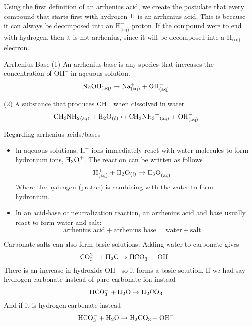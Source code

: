 \documentclass[12pt]{report}
\begin{document}
\begin{remark}{ } 
    Using the first definition of an arrhenius acid, we create the postulate that every compound that starts first with hydrogen $ \ce{H}$ is an arrhenius acid. This is because it can always be decomposed into an $\text{H}^{+}_{\text{(aq)}}$ proton. If the compound were to end with hydrogen, then it is not arrhenius, since it will be decomposed into a $\text{H}^{-}_{\text{(aq)}}$ electron. 
\end{remark}

\begin{definition}{Arrhenius Base}
    (1) An arrhenius base is any species that increases the concentration of $\text{OH}^{-}$ in aqeuous solution. 
    \[
        \ce{NaOH_{(aq)}}\to \ce{Na^{+}_{(aq)}}+ \text{OH}^{-}_{\text{(aq)}}
    \]

    (2) A substance that produces $\text{OH}^{-}$ when dissolved in water. 
    \[
        \ce{CH3NH2_{(aq)}}+ \ce{H2O_{(\l)}}\leftrightarrow \ce{CH3} \ce{NH3^{+}_{(aq)}}+ \text{OH}^{-}_{\text{(aq)}}
    \]
\end{definition}
\begin{note}{ }
    Regarding arrhenius acids/bases
    \begin{itemize}
        \item{In aqeuous solutions, $\text{H}^{+}$ ions immediately react with water molecules to form hydronium ions, $\ce{H3} \text{O}^{+}$. The reaction can be written as follows
                \[
                    \text{H}^{+}_{\text{(aq)}}+ \ce{H2O_{( \ell )}}\to \ce{H3} \text{O}^{+}_{\text{(aq)}}
                \]
            Where the hydrogen (proton) is combining with the water to form hydronium.
            }
        \item{In an acid-base or neutralization reaction, an arrhenius acid and base usually react to form water and salt:}
            \[
                \text{arrhenius acid}+ \text{arrhenius base}= \text{water}+ \text{salt}
            \]
    \end{itemize}
\end{note}

Carbonate salts can also form basic solutions. Adding water to carbonate gives 
\[
    \text{CO}^{2-}_{3}+ \ce{H2O}\to \text{HCO}^{-}_{3}+ \text{OH}^{-}
\]
There is an increase in hydroxide $ \text{OH}^{-}$ so it forms a basic solution. If we had say hydrogen carbonate instead of pure carbonate ion instead 
\[
    \text{HCO}^{-}_{3}+ \ce{H2O}\to \ce{H2CO3}
\]
And if it is hydrogen carbonate instead 
\[
    \text{HCO}^{-}_{3}+ \ce{H2O}\to \ce{H2CO3}+ \text{OH}^{-}
\]
\end{document}

